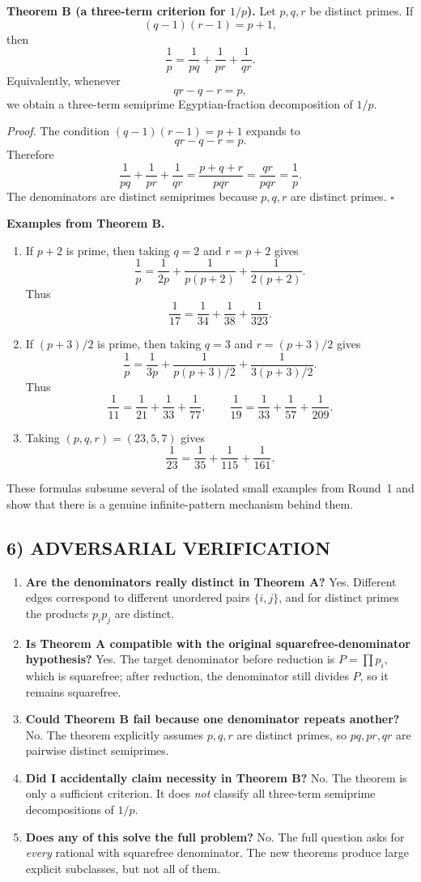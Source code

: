 \medskip
\textbf{Theorem B (a three-term criterion for \(1/p\)).}
Let \(p,q,r\) be distinct primes.
If
\[
  (q-1)(r-1)=p+1,
\]
then
\[
  \frac1p=\frac1{pq}+\frac1{pr}+\frac1{qr}.
\]
Equivalently, whenever
\[
  qr-q-r=p,
\]
we obtain a three-term semiprime Egyptian-fraction decomposition of \(1/p\).

\medskip
\textit{Proof.}
The condition \((q-1)(r-1)=p+1\) expands to
\[
  qr-q-r=p.
\]
Therefore
\[
  \frac1{pq}+\frac1{pr}+\frac1{qr}
  =\frac{p+q+r}{pqr}
  =\frac{qr}{pqr}
  =\frac1p.
\]
The denominators are distinct semiprimes because \(p,q,r\) are distinct primes.
\hfill \(\square\)

\medskip
\textbf{Examples from Theorem B.}
\begin{enumerate}
\item If \(p+2\) is prime, then taking \(q=2\) and \(r=p+2\) gives
\[
  \frac1p=\frac1{2p}+\frac1{p(p+2)}+\frac1{2(p+2)}.
\]
Thus
\[
  \frac1{17}=\frac1{34}+\frac1{38}+\frac1{323}.
\]
\item If \((p+3)/2\) is prime, then taking \(q=3\) and \(r=(p+3)/2\) gives
\[
  \frac1p=\frac1{3p}+\frac1{p(p+3)/2}+\frac1{3(p+3)/2}.
\]
Thus
\[
  \frac1{11}=\frac1{21}+\frac1{33}+\frac1{77},
  \qquad
  \frac1{19}=\frac1{33}+\frac1{57}+\frac1{209}.
\]
\item Taking \((p,q,r)=(23,5,7)\) gives
\[
  \frac1{23}=\frac1{35}+\frac1{115}+\frac1{161}.
\]
\end{enumerate}
These formulas subsume several of the isolated small examples from Round~1 and show that there is a genuine infinite-pattern mechanism behind them.

\subsection*{6) ADVERSARIAL VERIFICATION}
\begin{enumerate}
\item \textbf{Are the denominators really distinct in Theorem A?}
Yes. Different edges correspond to different unordered pairs \(\{i,j\}\), and for distinct primes the products \(p_i p_j\) are distinct.
\item \textbf{Is Theorem A compatible with the original squarefree-denominator hypothesis?}
Yes. The target denominator before reduction is \(P=\prod p_i\), which is squarefree; after reduction, the denominator still divides \(P\), so it remains squarefree.
\item \textbf{Could Theorem B fail because one denominator repeats another?}
No. The theorem explicitly assumes \(p,q,r\) are distinct primes, so \(pq,pr,qr\) are pairwise distinct semiprimes.
\item \textbf{Did I accidentally claim necessity in Theorem B?}
No. The theorem is only a sufficient criterion. It does \emph{not} classify all three-term semiprime decompositions of \(1/p\).
\item \textbf{Does any of this solve the full problem?}
No. The full question asks for \emph{every} rational with squarefree denominator. The new theorems produce large explicit subclasses, but not all of them.
\end{enumerate}


